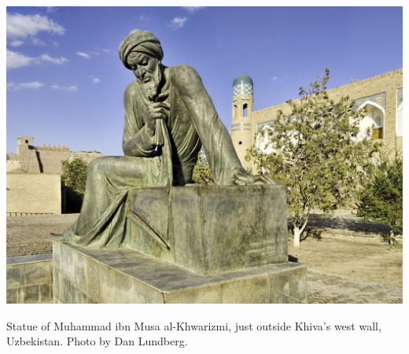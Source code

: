 \documentclass[a4paper, justified, notitlepage, sfsidenotes, notoc]{tufte-book}
\begin{document}
\begin{marginfigure}
  \includegraphics[width=\linewidth]{images/Muhammad ibn Musa al-Khwarizmi.jpg}
  \caption{Statue of Muhammad ibn Musa al-Khwarizmi, just outside Khiva’s west wall, Uzbekistan. Photo by Dan Lundberg.}
  \label{fig:marginfig}
\end{marginfigure}
\end{document}
